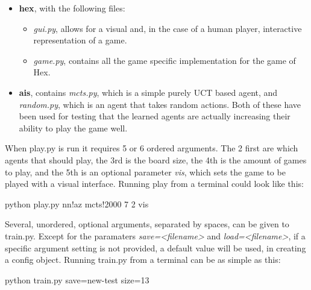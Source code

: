 \begin{itemize}
	\item \textbf{hex}, with the following files:
	\begin{itemize}
		\itemsep-0.3em 
		\item \textit{gui.py}, allows for a visual and, in the case of a human player, interactive representation of a game.
		\item \textit{game.py}, contains all the game specific implementation for the game of Hex.
	\end{itemize}
	\item \textbf{ais}, contains \textit{mcts.py}, which is a simple purely UCT based agent, and \textit{random.py}, which is an agent that takes random actions. Both of these have been used for testing that the learned agents are actually increasing their ability to play the game well. 
\end{itemize}

When play.py is run it requires 5 or 6 ordered arguments. The 2 first are which agents that should play, the 3rd is the board size, the 4th is the amount of games to play, and the 5th is an optional parameter \textit{vis}, which sets the game to be played with a visual interface. Running play from a terminal could look like this:

\begin{displayquote}
{\normalfont\ttfamily python play.py nn!az mcts!2000 7 2 vis}
\end{displayquote}

Several, unordered, optional arguments, separated by spaces, can be given to train.py. Except for the paramaters \textit{save=<filename>} and \textit{load=<filename>}, if a specific argument setting is not provided, a default value will be used, in creating a config object. Running train.py from a terminal can be as simple as this:

\begin{displayquote}
{\normalfont\ttfamily python train.py save=new-test size=13}
\end{displayquote}

